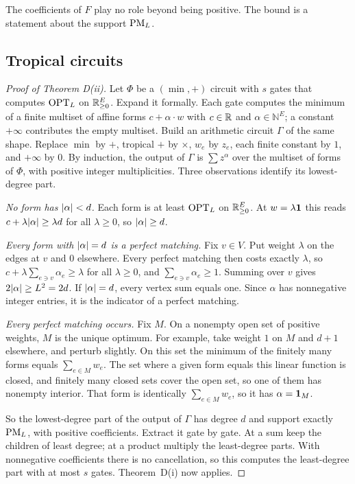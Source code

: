 The coefficients of $F$ play no role beyond being positive. The bound is a statement about the support $\mathrm{PM}_L$.

\subsection{Tropical circuits}

\begin{proof}[Proof of Theorem D(ii)]
Let $\Phi$ be a $(\min,+)$ circuit with $s$ gates that computes $\mathrm{OPT}_L$ on $\mathbb{R}_{\ge0}^E$. Expand it formally. Each gate computes the minimum of a finite multiset of affine forms $c+\alpha\cdot w$ with $c\in\mathbb{R}$ and $\alpha\in\mathbb N^E$; a constant $+\infty$ contributes the empty multiset. Build an arithmetic circuit $\Gamma$ of the same shape. Replace $\min$ by $+$, tropical $+$ by $\times$, $w_e$ by $z_e$, each finite constant by $1$, and $+\infty$ by $0$. By induction, the output of $\Gamma$ is $\sum z^{\alpha}$ over the multiset of forms of $\Phi$, with positive integer multiplicities. Three observations identify its lowest-degree part.

\emph{No form has $\lvert \alpha\rvert<d$.} Each form is at least $\mathrm{OPT}_L$ on $\mathbb{R}_{\ge0}^E$. At $w=\lambda\mathbf{1}$ this reads $c+\lambda\lvert \alpha\rvert\ge\lambda d$ for all $\lambda\ge0$, so $\lvert \alpha\rvert\ge d$.

\emph{Every form with $\lvert \alpha\rvert=d$ is a perfect matching.} Fix $v\in V$. Put weight $\lambda$ on the edges at $v$ and $0$ elsewhere. Every perfect matching then costs exactly $\lambda$, so $c+\lambda\sum_{e\ni v}\alpha_e\ge\lambda$ for all $\lambda\ge0$, and $\sum_{e\ni v}\alpha_e\ge1$. Summing over $v$ gives $2\lvert \alpha\rvert\ge L^2=2d$. If $\lvert \alpha\rvert=d$, every vertex sum equals one. Since $\alpha$ has nonnegative integer entries, it is the indicator of a perfect matching.

\emph{Every perfect matching occurs.} Fix $M$. On a nonempty open set of positive weights, $M$ is the unique optimum. For example, take weight $1$ on $M$ and $d+1$ elsewhere, and perturb slightly. On this set the minimum of the finitely many forms equals $\sum_{e\in M}w_e$. The set where a given form equals this linear function is closed, and finitely many closed sets cover the open set, so one of them has nonempty interior. That form is identically $\sum_{e\in M}w_e$, so it has $\alpha=\mathbf{1}_M$.

So the lowest-degree part of the output of $\Gamma$ has degree $d$ and support exactly $\mathrm{PM}_L$, with positive coefficients. Extract it gate by gate. At a sum keep the children of least degree; at a product multiply the least-degree parts. With nonnegative coefficients there is no cancellation, so this computes the least-degree part with at most $s$ gates. Theorem~D(i) now applies.
\end{proof}

